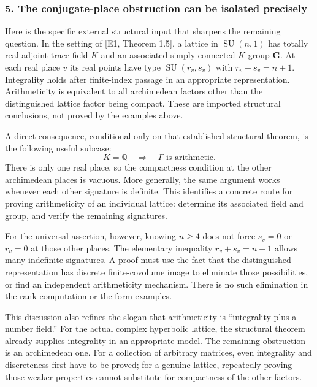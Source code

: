 \documentclass[11pt]{article}
\begin{document}
\subsubsection{5. The conjugate-place obstruction can be isolated precisely}
Here is the specific external structural input that sharpens the remaining question. In the setting of [E1, Theorem 1.5], a lattice in $\operatorname{SU}(n,1)$ has totally real adjoint trace field $K$ and an associated simply connected $K$-group $\mathbf G$. At each real place $v$ its real points have type $\operatorname{SU}(r_v,s_v)$ with $r_v+s_v=n+1$. Integrality holds after finite-index passage in an appropriate representation. Arithmeticity is equivalent to all archimedean factors other than the distinguished lattice factor being compact. These are imported structural conclusions, not proved by the examples above.

A direct consequence, conditional only on that established structural theorem, is the following useful subcase:
\[
 K=\mathbb Q\quad\Longrightarrow\quad\Gamma\text{ is arithmetic}.
 \tag{351.6}
\]
There is only one real place, so the compactness condition at the other archimedean places is vacuous. More generally, the same argument works whenever each other signature is definite. This identifies a concrete route for proving arithmeticity of an individual lattice: determine its associated field and group, and verify the remaining signatures.

For the universal assertion, however, knowing $n\ge4$ does not force $s_v=0$ or $r_v=0$ at those other places. The elementary inequality $r_v+s_v=n+1$ allows many indefinite signatures. A proof must use the fact that the distinguished representation has discrete finite-covolume image to eliminate those possibilities, or find an independent arithmeticity mechanism. There is no such elimination in the rank computation or the form examples.

This discussion also refines the slogan that arithmeticity is ``integrality plus a number field.'' For the actual complex hyperbolic lattice, the structural theorem already supplies integrality in an appropriate model. The remaining obstruction is an archimedean one. For a collection of arbitrary matrices, even integrality and discreteness first have to be proved; for a genuine lattice, repeatedly proving those weaker properties cannot substitute for compactness of the other factors.
\end{document}
